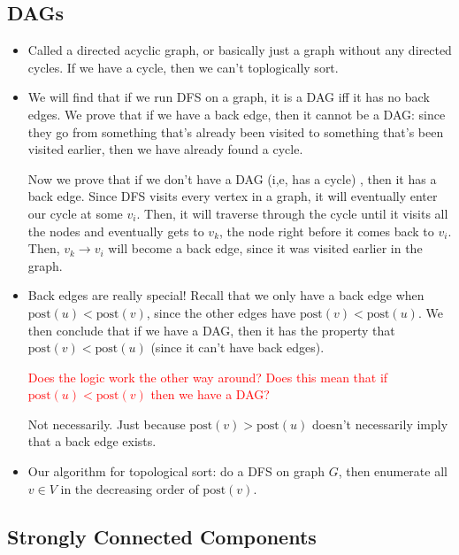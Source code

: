 \documentclass[10pt]{article}
\newcommand{\post}{\mathrm{post}}
\newcommand{\question}[1]{\textcolor{red}{#1}}
\newcommand{\answer}[1]{\textcolor{green!80!black!}{#1}}
\begin{document}
	\subsection{DAGs}
	\begin{itemize}
		\item Called a directed acyclic graph, or basically just a graph without any directed cycles. If 
			we have a cycle, then we can't toplogically sort. 
		\item We will find that if we run DFS on a graph, it is a DAG iff it has no back edges.
			We prove that if we have a back edge, then it cannot be a DAG: since they go from something 
			that's already been visited to something that's been visited earlier, then we have already 
			found a cycle. 

			Now we prove that if we don't have a DAG (i,e, has a cycle) , then it has a back edge. Since DFS
			visits every vertex in 
			a graph, it will eventually enter our cycle at some $v_i$. Then, it will traverse through the cycle
			until it visits all the nodes and eventually gets to $v_k$, the node right before it comes back to 
			$v_i$. 
			Then, $v_k \to v_i$ will become a back edge, since it was visited earlier in the graph.
		\item Back edges are really special! Recall that we only have a back edge when $\post(u) < \post(v)$, 
			since the other edges have $\post(v) < \post(u)$. We then conclude that if we have a DAG, then 
			it has the property that $\post(v) < \post(u)$ (since it can't have back edges). 
			
			\question{Does 
				the logic work the other way around? Does 
			this mean that if $\post(u) < \post(v)$ then we have a DAG?}

			\answer{Not necessarily. Just because $\post(v) > \post(u)$ doesn't necessarily imply that a 
			back edge exists.}
		\item Our algorithm for topological sort: do a DFS on graph $G$, then enumerate all $v \in V$ in 
			the decreasing order of $\post(v)$. 
	\end{itemize}

	\subsection{Strongly Connected Components}
	
\end{document}
